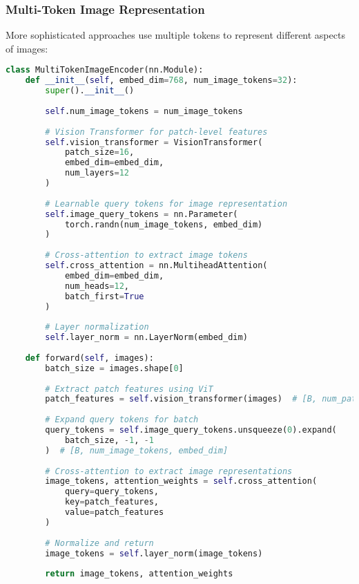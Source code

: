 \subsubsection{Multi-Token Image Representation}

More sophisticated approaches use multiple tokens to represent different aspects of images:

\begin{lstlisting}[language=Python, caption=Multi-token image representation]
class MultiTokenImageEncoder(nn.Module):
    def __init__(self, embed_dim=768, num_image_tokens=32):
        super().__init__()
        
        self.num_image_tokens = num_image_tokens
        
        # Vision Transformer for patch-level features
        self.vision_transformer = VisionTransformer(
            patch_size=16,
            embed_dim=embed_dim,
            num_layers=12
        )
        
        # Learnable query tokens for image representation
        self.image_query_tokens = nn.Parameter(
            torch.randn(num_image_tokens, embed_dim)
        )
        
        # Cross-attention to extract image tokens
        self.cross_attention = nn.MultiheadAttention(
            embed_dim=embed_dim,
            num_heads=12,
            batch_first=True
        )
        
        # Layer normalization
        self.layer_norm = nn.LayerNorm(embed_dim)
    
    def forward(self, images):
        batch_size = images.shape[0]
        
        # Extract patch features using ViT
        patch_features = self.vision_transformer(images)  # [B, num_patches, embed_dim]
        
        # Expand query tokens for batch
        query_tokens = self.image_query_tokens.unsqueeze(0).expand(
            batch_size, -1, -1
        )  # [B, num_image_tokens, embed_dim]
        
        # Cross-attention to extract image representations
        image_tokens, attention_weights = self.cross_attention(
            query=query_tokens,
            key=patch_features,
            value=patch_features
        )
        
        # Normalize and return
        image_tokens = self.layer_norm(image_tokens)
        
        return image_tokens, attention_weights
\end{lstlisting}

